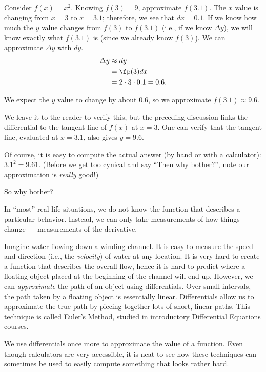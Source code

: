 \begin{example}\label{ex_diffal1}
Consider $f(x) = x^2$. Knowing $f(3) = 9$, approximate $f(3.1)$.
\solution
The $x$ value is changing from $x=3$ to $x=3.1$; therefore, we see that $dx=0.1$. If we know how much the $y$ value changes from $f(3)$ to $f(3.1)$ (i.e., if we know $\Delta y$), we will know exactly what $f(3.1)$ is (since we already know $f(3)$). We can approximate $\Delta y$ with $dy$.
\begin{align*}
	\Delta y &\approx dy \\
	&= \fp(3)dx \\
	&= 2\cdot 3\cdot 0.1 = 0.6.
\end{align*}

We expect the $y$ value to change by about $0.6$, so we approximate $f(3.1) \approx 9.6.$

We leave it to the reader to verify this, but the preceding discussion links the differential to the tangent line of $f(x)$ at $x=3$. One can verify that the tangent line, evaluated at $x=3.1$, also gives $y=9.6$.
\end{example}

Of course, it is easy to compute the actual answer (by hand or with a calculator): $3.1^2 = 9.61.$ (Before we get too cynical and say ``Then why bother?'', note our approximation is \textit{really} good!)

So why bother?

In ``most'' real life situations, we do not know the function that describes a particular behavior. Instead, we can only take measurements of how things change --- measurements of the derivative.

Imagine water flowing down a winding channel. It is easy to measure the speed and direction (i.e., the \textit{velocity}) of water at any location. It is very hard to create a function that describes the overall flow, hence it is hard to predict where a floating object placed at the beginning of the channel will end up. However, we can \textit{approximate} the path of an object using differentials. Over small intervals, the path taken by a floating object is essentially linear. Differentials allow us to approximate the true path by piecing together lots of short, linear paths. This technique is called Euler's Method, studied in introductory Differential Equations courses.

We use differentials once more to approximate the value of a function. Even though calculators are very accessible, it is neat to see how these techniques can sometimes be used to easily compute something that looks rather hard.

